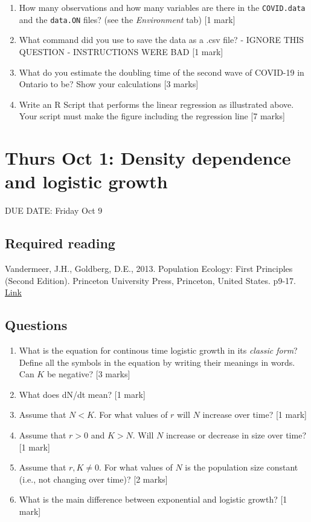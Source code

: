 \documentclass[]{book}
\begin{document}
\begin{enumerate}
\def\labelenumi{\arabic{enumi}.}
\item
  How many observations and how many variables are there in the
  \texttt{COVID.data} and the \texttt{data.ON} files? (see the
  \emph{Environment} tab) {[}1 mark{]}
\item
  What command did you use to save the data as a .csv file? - IGNORE
  THIS QUESTION - INSTRUCTIONS WERE BAD {[}1 mark{]}
\item
  What do you estimate the doubling time of the second wave of COVID-19
  in Ontario to be? Show your calculations {[}3 marks{]}
\item
  Write an R Script that performs the linear regression as illustrated
  above. Your script must make the figure including the regression line
  {[}7 marks{]}
\end{enumerate}

\chapter{Thurs Oct 1: Density dependence and logistic
growth}\label{thurs-oct-1-density-dependence-and-logistic-growth}

DUE DATE: Friday Oct 9

\section{Required reading}\label{required-reading-3}

Vandermeer, J.H., Goldberg, D.E., 2013. Population Ecology: First
Principles (Second Edition). Princeton University Press, Princeton,
United States. p9-17.
\href{https://ebookcentral-proquest-com.qe2a-proxy.mun.ca/lib/mun/detail.action?docID=1205619}{Link}

\section{Questions}\label{questions-8}

\begin{enumerate}
\def\labelenumi{\arabic{enumi}.}
\item
  What is the equation for continous time logistic growth in its
  \emph{classic form}? Define all the symbols in the equation by writing
  their meanings in words. Can \(K\) be negative? {[}3 marks{]}
\item
  What does dN/dt mean? {[}1 mark{]}
\item
  Assume that \(N < K\). For what values of \(r\) will \(N\) increase
  over time? {[}1 mark{]}
\item
  Assume that \(r > 0\) and \(K > N\). Will \(N\) increase or decrease
  in size over time? {[}1 mark{]}
\item
  Assume that \(r,K \neq 0\). For what values of \(N\) is the population
  size constant (i.e., not changing over time)? {[}2 marks{]}
\item
  What is the main difference between exponential and logistic growth?
  {[}1 mark{]}
\end{enumerate}
\end{document}
